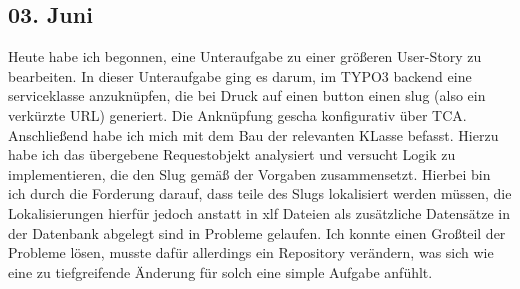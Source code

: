 \subsection{03. Juni}
Heute habe ich begonnen, eine Unteraufgabe zu einer größeren User-Story zu bearbeiten. In dieser Unteraufgabe ging es darum, im TYPO3 backend eine serviceklasse anzuknüpfen, die bei Druck auf einen button einen slug (also ein verkürzte URL) generiert. Die Anknüpfung gescha konfigurativ über TCA. Anschließend habe ich mich mit dem Bau der relevanten KLasse befasst. Hierzu habe ich das übergebene Requestobjekt analysiert und versucht Logik zu implementieren, die den Slug gemäß der Vorgaben zusammensetzt. Hierbei bin ich durch die Forderung darauf, dass teile des Slugs lokalisiert werden müssen, die Lokalisierungen hierfür jedoch anstatt in xlf Dateien als zusätzliche Datensätze in der Datenbank abgelegt sind in Probleme gelaufen.
Ich konnte einen Großteil der Probleme lösen, musste dafür allerdings ein Repository verändern, was sich wie eine zu tiefgreifende Änderung für solch eine simple Aufgabe anfühlt.